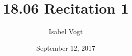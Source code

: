 \documentclass[11pt]{article}
\title{18.06 Recitation 1}
\author{Isabel Vogt}
\date{September 12, 2017}                                           %
\begin{document}
\maketitle



\begin{enumerate}

%
%
%
%
%
%
%
%
%
%
%
%
%

\end{enumerate}
\end{document}
